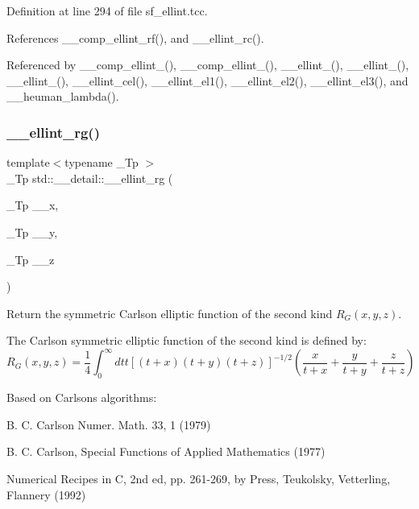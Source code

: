 Definition at line 294 of file sf\+\_\+ellint.\+tcc.



References \+\_\+\+\_\+comp\+\_\+ellint\+\_\+rf(), and \+\_\+\+\_\+ellint\+\_\+rc().



Referenced by \+\_\+\+\_\+comp\+\_\+ellint\+\_(), \+\_\+\+\_\+comp\+\_\+ellint\+\_(), \+\_\+\+\_\+ellint\+\_(), \+\_\+\+\_\+ellint\+\_(), \+\_\+\+\_\+ellint\+\_(), \+\_\+\+\_\+ellint\+\_\+cel(), \+\_\+\+\_\+ellint\+\_\+el1(), \+\_\+\+\_\+ellint\+\_\+el2(), \+\_\+\+\_\+ellint\+\_\+el3(), and \+\_\+\+\_\+heuman\+\_\+lambda().

\mbox{\label{namespacestd_1_1____detail_aaceff1eb320e0602afee36c60b80f87a}} 
\subsubsection{\texorpdfstring{\+\_\+\+\_\+ellint\+\_\+rg()}{\_\_ellint\_rg()}}
{\footnotesize\ttfamily template$<$typename \+\_\+\+Tp $>$ \\
\+\_\+\+Tp std\+::\+\_\+\+\_\+detail\+::\+\_\+\+\_\+ellint\+\_\+rg (\begin{DoxyParamCaption}\item[{\+\_\+\+Tp}]{\+\_\+\+\_\+x,  }\item[{\+\_\+\+Tp}]{\+\_\+\+\_\+y,  }\item[{\+\_\+\+Tp}]{\+\_\+\+\_\+z }\end{DoxyParamCaption})}



Return the symmetric Carlson elliptic function of the second kind $ R_G(x,y,z) $. 

The Carlson symmetric elliptic function of the second kind is defined by\+: \[ R_G(x,y,z) = \frac{1}{4} \int_0^\infty dt t [(t + x)(t + y)(t + z)]^{-1/2} (\frac{x}{t + x} + \frac{y}{t + y} + \frac{z}{t + z}) \]

Based on Carlson\textquotesingle{}s algorithms\+:
\begin{DoxyItemize}
\item B. C. Carlson Numer. Math. 33, 1 (1979)
\item B. C. Carlson, Special Functions of Applied Mathematics (1977)
\item Numerical Recipes in C, 2nd ed, pp. 261-\/269, by Press, Teukolsky, Vetterling, Flannery (1992)
\end{DoxyItemize}


